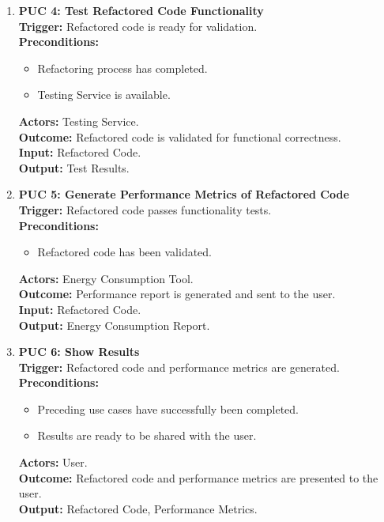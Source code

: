 \documentclass[12pt]{article}
\begin{document}
\begin{enumerate}
\item \textbf{PUC 4: Test Refactored Code Functionality} \\
\textbf{Trigger:} Refactored code is ready for validation. \\
\textbf{Preconditions:}
\begin{itemize}
    \item Refactoring process has completed.
    \item Testing Service is available.
\end{itemize}
\textbf{Actors:} Testing Service. \\
\textbf{Outcome:} Refactored code is validated for functional correctness. \\
\textbf{Input:} Refactored Code. \\
\textbf{Output:} Test Results.

\item \textbf{PUC 5: Generate Performance Metrics of Refactored Code} \\
\textbf{Trigger:} Refactored code passes functionality tests. \\
\textbf{Preconditions:}
\begin{itemize}
    \item Refactored code has been validated.
\end{itemize}
\textbf{Actors:} Energy Consumption Tool. \\
\textbf{Outcome:} Performance report is generated and sent to the user. \\
\textbf{Input:} Refactored Code. \\
\textbf{Output:} Energy Consumption Report.

\item \textbf{PUC 6: Show Results} \\
\textbf{Trigger:} Refactored code and performance metrics are generated. \\
\textbf{Preconditions:}
\begin{itemize}
    \item Preceding use cases have successfully been completed.
    \item Results are ready to be shared with the user.
\end{itemize}
\textbf{Actors:} User. \\
\textbf{Outcome:} Refactored code and performance metrics are presented to the user. \\
\textbf{Output:} Refactored Code, Performance Metrics.

\end{enumerate}
\end{document}
